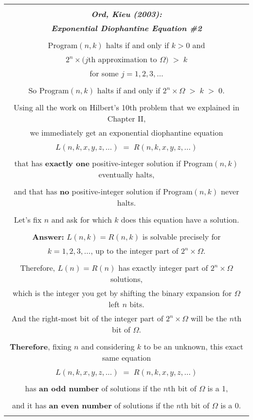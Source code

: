 \documentclass[12pt]{book}
\begin{document}
{\footnotesize
\begin{center}
\begin{tabular}{|c|}
\hline
\\
\textbf{\large \emph{Ord, Kieu (2003):}}
\\
\textbf{\large \emph{Exponential Diophantine Equation \#2}}
\\ \\
Program$(n,k)$ halts if and only if $k > 0$ and
\\
$2^n \times (j$th approximation to $\Omega) \; > \; k$
\\
for some $j = 1, 2, 3, \ldots$
\\ \\
So Program$(n,k)$ halts if and only if 
$2^n \times \Omega \; > \; k \; > \; 0$.
\\ \\
Using all the work on Hilbert's 10th problem that we explained in Chapter II,
\\
we immediately get an exponential diophantine equation
\\ \\
$L(n, k, x, y, z, \ldots) \; = \; R(n, k, x, y, z, \ldots)$
\\ \\
that has \textbf{exactly one} positive-integer solution
if Program$(n,k)$ eventually halts,
\\ \\
and that has \textbf{no} positive-integer solution if Program$(n,k)$ never halts.
\\ \\
Let's fix $n$ and ask for which $k$ does this equation have a solution.
\\ \\
\textbf{Answer:}
$L(n,k) = R(n,k)$ is solvable precisely for 
\\
$k = 1, 2, 3, \ldots$, 
up to the integer part of $2^n \times \Omega$.
\\ \\
Therefore, $L(n) = R(n)$ has exactly integer part of $2^n \times \Omega$ solutions,
\\
which is the integer you get by shifting the binary expansion for $\Omega$ left $n$ bits.
\\
And
the right-most bit of the integer part of $2^n \times \Omega$ will be the $n$th bit of $\Omega$.
\\ \\
\textbf{Therefore}, fixing $n$ and considering $k$ to be an unknown, this exact same equation
\\ \\
$L(n, k, x, y, z, \ldots) \; = \; R(n, k, x, y, z, \ldots)$
\\ \\
has \textbf{an odd number} of solutions
if the $n$th bit of $\Omega$ is a 1,
\\ \\
and it has \textbf{an even number} of solutions
if the $n$th bit of $\Omega$ is a 0.
\\
\\
\hline
\end{tabular}
\end{center}
}
\newpage
\end{document}

